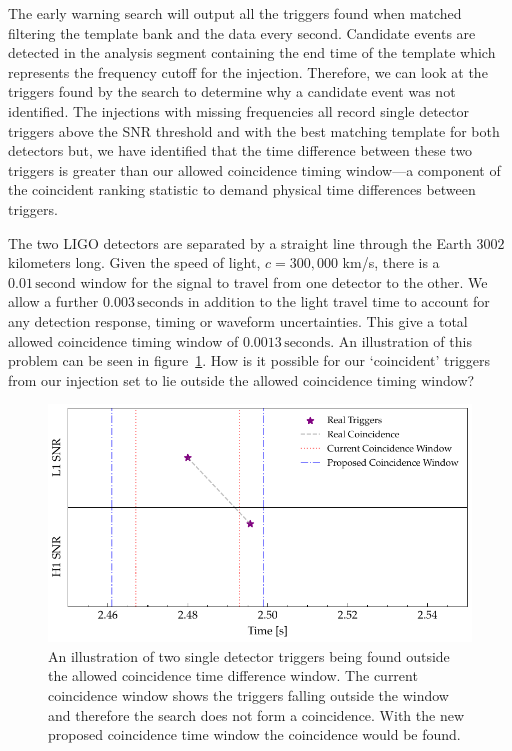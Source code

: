 The early warning search will output all the triggers found when matched filtering the template bank and the data every second. Candidate events are detected in the analysis segment containing the end time of the template which represents the frequency cutoff for the injection. Therefore, we can look at the triggers found by the search to determine why a candidate event was not identified. The injections with missing frequencies all record single detector triggers above the SNR threshold and with the best matching template for both detectors but, we have identified that the time difference between these two triggers is greater than our allowed coincidence timing window---a component of the coincident ranking statistic to demand physical time differences between triggers.

The two LIGO detectors are separated by a straight line through the Earth $3002$ kilometers long. Given the speed of light, $c = 300,000$ km/s, there is a $0.01 \, \text{second}$ window for the \gwadj signal to travel from one detector to the other. We allow a further $0.003 \, \text{seconds}$ in addition to the light travel time to account for any detection response, timing or waveform uncertainties. This give a total allowed coincidence timing window of $0.0013 \, \text{seconds}$. An illustration of this problem can be seen in figure~\ref{6:fig:outside_coinc_window}. How is it possible for our `coincident' triggers from our injection set to lie outside the allowed coincidence timing window?
%
\begin{figure}
    \centering
    \includegraphics[width=\textwidth]{images/6_earlywarning/identified-problems/outside_coinc_window.pdf}
    \caption{An illustration of two single detector triggers being found outside the allowed coincidence time difference window. The current coincidence window shows the triggers falling outside the window and therefore the search does not form a coincidence. With the new proposed coincidence time window the coincidence would be found.}
    \label{6:fig:outside_coinc_window}
\end{figure}
%


